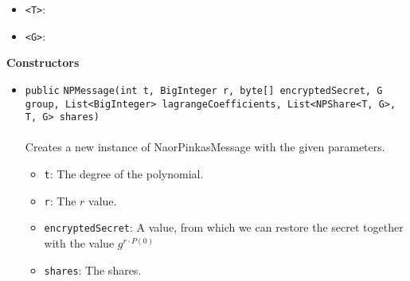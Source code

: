 \begin{itemize}
\item \lstinline|<T>|: 
\item \lstinline|<G>|: 
\end{itemize}



\textbf{\sffamily Constructors}
\begin{itemize}
\item \lstinline|public| \lstinline|NPMessage|\lstinline|(int t, BigInteger r, byte[] encryptedSecret, G group, List<BigInteger> lagrangeCoefficients, List<NPShare<T, G>, T, G> shares)|\\ \\[-0.6em]
Creates a new instance of NaorPinkasMessage with the given parameters.
\begin{itemize}
\item \lstinline|t|: The degree of the polynomial.
\item \lstinline|r|: The $r$ value.
\item \lstinline|encryptedSecret|: A value, from which we can restore the secret
                        together with the value $g^{r \cdot P(0)}$
\item \lstinline|shares|: The shares.
\end{itemize}



\end{itemize}


